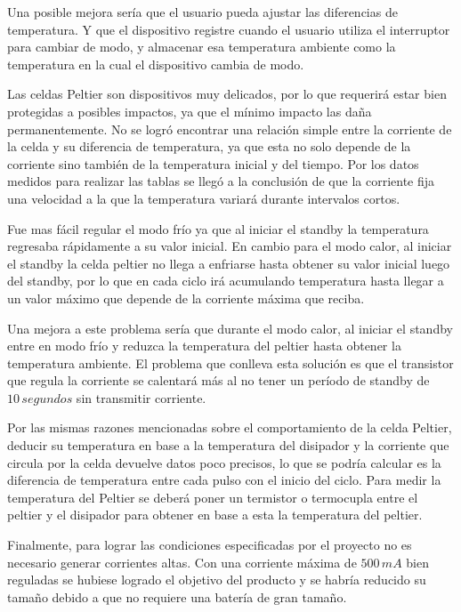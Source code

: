 \documentclass[10pt,spanish,a4paper,openany,notitlepage]{article}
\begin{document}
Una posible mejora sería que el usuario pueda ajustar las diferencias
de temperatura. Y que el dispositivo registre cuando el usuario utiliza
el interruptor para cambiar de modo, y almacenar esa temperatura ambiente
como la temperatura en la cual el dispositivo cambia de modo.

Las celdas Peltier son dispositivos muy delicados, por lo que requerirá
estar bien protegidas a posibles impactos, ya que el mínimo impacto
las daña permanentemente. 
No se logró encontrar una relación simple entre la corriente de la celda
y su diferencia de temperatura, ya que esta no solo depende de la corriente
sino también de la temperatura inicial y del tiempo. Por los datos medidos para realizar
las tablas se llegó a la conclusión de que la corriente fija una velocidad
a la que la temperatura variará durante intervalos cortos.

Fue mas fácil regular el modo frío ya que al iniciar el standby la
temperatura regresaba rápidamente a su valor inicial. En cambio para el
modo calor, al iniciar el standby la celda peltier no llega a enfriarse
hasta obtener su valor inicial luego del standby, por lo que en cada ciclo
irá acumulando temperatura hasta llegar a un valor máximo que depende
de la corriente máxima que reciba.

Una mejora a este problema sería que durante el modo calor, al iniciar
el standby entre en modo frío y reduzca la temperatura del peltier hasta
obtener la temperatura ambiente. El problema que conlleva esta solución
es que el transistor que regula la corriente se calentará más al no tener
un período de standby de $10\, \unit{segundos}$ sin transmitir corriente.

Por las mismas razones mencionadas sobre el comportamiento de la celda Peltier,
deducir su temperatura en base a la temperatura del disipador y la corriente
que circula por la celda devuelve datos poco precisos, lo que se podría calcular
es la diferencia de temperatura entre cada pulso con el inicio del ciclo.
Para medir la temperatura del Peltier se deberá poner un termistor o termocupla
entre el peltier y el disipador para obtener en base a esta la temperatura del
peltier.

Finalmente, para lograr las condiciones especificadas por el proyecto
no es necesario generar corrientes altas. Con una corriente máxima de
$500\, \unit{mA}$ bien reguladas se hubiese logrado el objetivo del producto
y se habría reducido su tamaño debido a que no requiere una batería de
gran tamaño.

\appendix 
\end{document}
